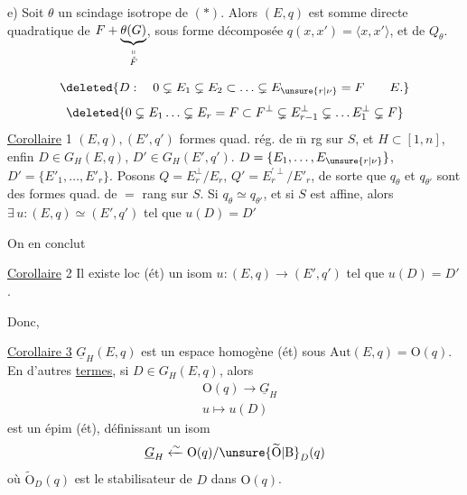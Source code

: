  e) Soit $\theta$ un scindage isotrope de $(*)$. Alors $(E,q)$ est somme directe quadratique de $F+\underbrace{\theta(G)}_{\substack{\shortparallel\\\check F}}$,    sous forme décomposée $q(x,x')=\langle x,x'\rangle$, et de $Q_\theta$.

\[
\deleted{D:\quad0\subsetneq E_1\subsetneq E_2\subset\ldots\subsetneq E_{\unsure{r|\nu}}=F\qquad E.}
\]
\[
\deleted{0\subsetneq E_1\ldots\subsetneq E_r=F\subset F^\perp\subsetneq E_{r-1}^{\perp}\subsetneq\ldots E_1^\perp\subsetneq F}
\]
\uline{Corollaire} 1  $(E,q),(E',q')$ formes quad. rég. de $\overline{\mathrm m}$ rg  sur $S$,  et $H\subset[1,n]$, enfin $D\in G_H(E,q)$, $D'\in G_H(E',q')$.  $D=\{E_1,\ldots,E_{\unsure{r|\nu}}\}$, $D'=\{E'_1,\ldots,E'_r\}$.  Posons $Q=E_r^\perp/E_r$, $Q'=E_r^{\prime\perp}/E'_r$, de sorte que $q_\theta$ et $q_{\theta'}$ sont des formes quad. de $=$ rang sur $S$. Si $q_\theta\simeq q_{\theta'}$,  et si $S$ est affine, alors  $\exists\,u:(E,q)\simeq(E',q')$ tel que $u(D)=D'$

On en conclut

\uline{Corollaire} 2 Il existe loc (ét) un isom $u:(E,q)\longrightarrow(E',q')$ tel que $u(D)=D'$.

Donc,

\uline{Corollaire 3} $\underline G_H(E,q)$ est un espace homogène (ét) sous $\mathrm{Aut}(E,q)=\mathrm O(q)$. En d'autres \uline{termes}, si $D\in G_H(E,q)$, alors
\[
\begin{aligned}
&\mathrm O(q)\longrightarrow\underline G_H\\
&u\longmapsto u(D)
\end{aligned}
\]
est un épim (ét),  définissant un isom
\[
\underline G_H\xleftarrow{\sim}\mathrm O(q)/\unsure{\widetilde{\mathrm O}|\mathrm B}_{D}(q)
\]
où $\widetilde{\mathrm O}_{D}(q)$ est le stabilisateur de $D$ dans $\mathrm O(q)$.

